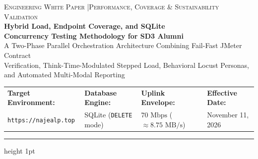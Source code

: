 \documentclass[11pt,letterpaper]{article}
\begin{document}
\thispagestyle{empty}
\begin{tcolorbox}[
  colback=NavyPrimary,
  colframe=NavyPrimary,
  arc=4pt,
  left=16pt,
  right=16pt,
  top=18pt,
  bottom=18pt
]
  {\color{RuleGray}\small\textsc{Engineering White Paper \quad|\quad Performance, Coverage \& Sustainability Validation}}\\[6pt]
  {\color{white}\LARGE\bfseries Hybrid Load, Endpoint Coverage, and SQLite\\Concurrency Testing Methodology for SD3 Alumni}\\[10pt]
  {\color{RuleGray}\normalsize
  A Two-Phase Parallel Orchestration Architecture Combining Fail-Fast JMeter Contract\\
  Verification, Think-Time-Modulated Stepped Load, Behavioral Locust Personas,\\
  and Automated Multi-Modal Reporting}
\end{tcolorbox}

\vspace{6pt}
\noindent\begin{tabularx}{\textwidth}{@{} >{\raggedright\arraybackslash}p{} >{\raggedright\arraybackslash}p{} >{\raggedright\arraybackslash}p{} >{\raggedright\arraybackslash}X @{}}
  \textbf{Target Environment:} & \textbf{Database Engine:} & \textbf{Uplink Envelope:} & \textbf{Effective Date:} \\
  \texttt{https://najealp.top} & SQLite (\texttt{DELETE} mode) & $70\text{ Mbps}$ ($\approx 8.75\text{ MB/s}$) & November 11, 2026 \\
\end{tabularx}
\vspace{8pt}
{\color{RuleGray}\hrule height 1pt}
\vspace{10pt}
\end{document}
